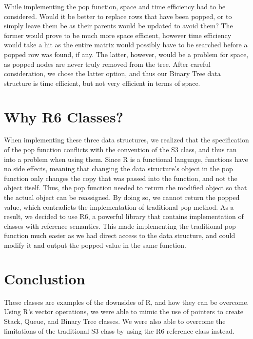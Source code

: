 \documentclass[12pt,letterpaper]{article}
\begin{document}
While implementing the pop function, space and time efficiency had to be
considered. Would it be better to replace rows that have been popped, or to
simply leave them be as their parents would be updated to avoid them? The
former would prove to be much more space efficient, however time efficiency
would take a hit as the entire matrix would possibly have to be searched before
a popped row was found, if any. The latter, however, would be a problem for
space, as popped nodes are never truly removed from the tree. After careful
consideration, we chose the latter option, and thus our Binary Tree data
structure is time efficient, but not very efficient in terms of space.

\section{Why R6 Classes?}
When implementing these three data structures, we realized that the
specification of the pop function conflicts with the convention of the S3
class, and thus ran into a problem when using them. Since R is a functional
language, functions have no side effects, meaning that changing the data
structure’s object in the pop function only changes the copy that was passed
into the function, and not the object itself. Thus, the pop function needed to
return the modified object so that the actual object can be reassigned. By
doing so, we cannot return the popped value, which contradicts the
implementation of traditional pop method. As a result, we decided to use R6, a
powerful library that contains implementation of classes with reference
semantics. This made implementing the traditional pop function much easier as
we had direct access to the data structure, and could modify it and output the
popped value in the same function.

\section{Conclustion}
These classes are examples of the downsides of R, and how they can be overcome.
Using R's vector operations, we were able to mimic the use of pointers to
create Stack, Queue, and Binary Tree classes. We were also able to overcome the
limitations of the traditional S3 class by using the R6 reference class instead.
\end{document}
